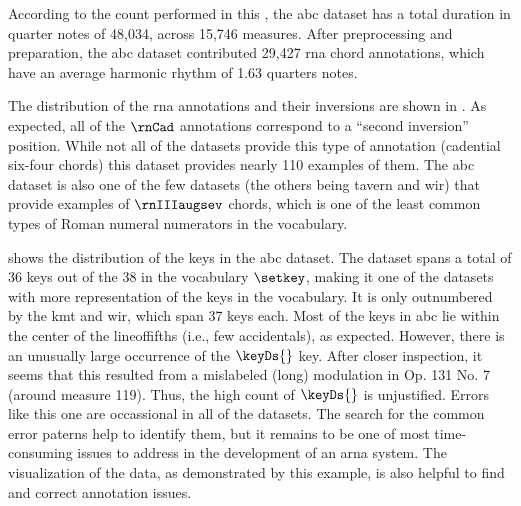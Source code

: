 
According to the count performed in this \thesisdiss{}, the
\gls{abc} dataset has a total duration in quarter notes of
48,034, across 15,746 measures. After preprocessing and
preparation, the \gls{abc} dataset contributed 29,427
\gls{rna} chord annotations, which have an average harmonic
rhythm of 1.63 \glspl{quarter} notes.

The distribution of the \gls{rna} annotations and their
inversions are shown in . As
expected, all of the $\rnCad$ annotations correspond to a
``second inversion'' position. While not all of the datasets
provide this type of annotation (cadential six-four chords)
this dataset provides nearly 110 examples of them. The
\gls{abc} dataset is also one of the few datasets (the
others being \gls{tavern} and \gls{wir}) that provide
examples of $\rnIIIaugsev$ chords, which is one of the least
common types of Roman numeral numerators in the vocabulary.



 shows the distribution of the keys
in the \gls{abc} dataset. The dataset spans a total of 36
keys out of the 38 in the vocabulary $\setkey$, making it
one of the datasets with more representation of the keys in
the vocabulary. It is only outnumbered by the \gls{kmt} and
\gls{wir}, which span 37 keys each. Most of the keys in
\gls{abc} lie within the center of the \gls{lineoffifths}
(i.e., few accidentals), as expected. However, there is an
unusually large occurrence of the $\keyDs{}$ key. After
closer inspection, it seems that this resulted from a
mislabeled (long) modulation in Op. 131 No. 7 (around
measure 119). Thus, the high count of $\keyDs{}$ is
unjustified. Errors like this one are occassional in all of
the datasets. The search for the common error paterns help
to identify them, but it remains to be one of most
time-consuming issues to address in the development of an
\gls{arna} system. The visualization of the data, as
demonstrated by this example, is also helpful to find and
correct annotation issues.


